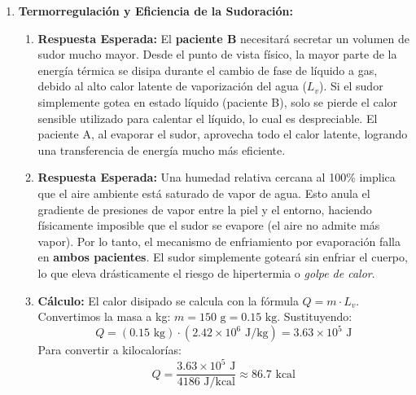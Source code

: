 \documentclass[11pt,letterpaper]{article}
\begin{document}
\begin{enumerate}[leftmargin=*]

    \item \textbf{Termorregulación y Eficiencia de la Sudoración:}
    \begin{enumerate}
        \item \textbf{Respuesta Esperada:} El \textbf{paciente B} necesitará secretar un volumen de sudor mucho mayor. Desde el punto de vista físico, la mayor parte de la energía térmica se disipa durante el cambio de fase de líquido a gas, debido al alto calor latente de vaporización del agua ($L_v$). Si el sudor simplemente gotea en estado líquido (paciente B), solo se pierde el calor sensible utilizado para calentar el líquido, lo cual es despreciable. El paciente A, al evaporar el sudor, aprovecha todo el calor latente, logrando una transferencia de energía mucho más eficiente.
        \item \textbf{Respuesta Esperada:} Una humedad relativa cercana al 100\% implica que el aire ambiente está saturado de vapor de agua. Esto anula el gradiente de presiones de vapor entre la piel y el entorno, haciendo físicamente imposible que el sudor se evapore (el aire no admite más vapor). Por lo tanto, el mecanismo de enfriamiento por evaporación falla en \textbf{ambos pacientes}. El sudor simplemente goteará sin enfriar el cuerpo, lo que eleva drásticamente el riesgo de hipertermia o \textit{golpe de calor}.
        \item \textbf{Cálculo:} El calor disipado se calcula con la fórmula $Q = m \cdot L_v$. Convertimos la masa a kg: $m = 150 \text{ g} = 0.15 \text{ kg}$. Sustituyendo:
        \[ Q = (0.15 \text{ kg}) \cdot (2.42 \times 10^6 \text{ J/kg}) = 3.63 \times 10^5 \text{ J} \]
        Para convertir a kilocalorías:
        \[ Q = \frac{3.63 \times 10^5 \text{ J}}{4186 \text{ J/kcal}} \approx 86.7 \text{ kcal} \]
    \end{enumerate}

    \vspace{0.2cm}


\end{enumerate}
\end{document}
